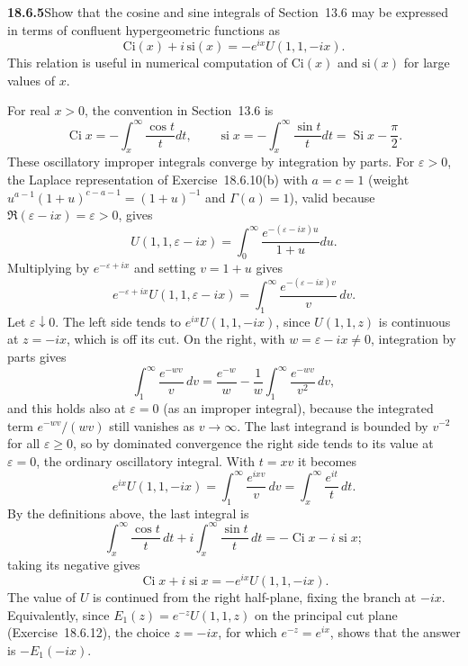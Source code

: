 \par\bigskip
\noindent\textbf{18.6.5}\quad Show that the cosine and sine
integrals of Section~13.6 may be expressed in terms of confluent
hypergeometric functions as
\[
\mathrm{Ci}(x)+i\,\mathrm{si}(x)=-e^{ix}U(1,1,-ix).
\]
This relation is useful in numerical computation of
$\mathrm{Ci}(x)$ and $\mathrm{si}(x)$ for large values of $x$.
\par\nobreak
\solution
For real $x>0$, the convention in Section~13.6 is
\[
\operatorname{Ci}x=-\int_x^\infty\frac{\cos t}{t}dt,
\qquad \operatorname{si}x=-\int_x^\infty\frac{\sin t}{t}dt
                         =\operatorname{Si}x-\frac\pi2.
\]
These oscillatory improper integrals converge by integration by
parts.  For $\varepsilon>0$, the Laplace representation of
Exercise~18.6.10(b) with $a=c=1$ (weight
$u^{a-1}(1+u)^{c-a-1}=(1+u)^{-1}$ and $\Gamma(a)=1$), valid because
$\Re(\varepsilon-ix)=\varepsilon>0$, gives
\[
U(1,1,\varepsilon-ix)
 =\int_0^\infty\frac{e^{-(\varepsilon-ix)u}}{1+u}du.
\]
Multiplying by $e^{-\varepsilon+ix}$ and setting $v=1+u$ gives
\[
e^{-\varepsilon+ix}U(1,1,\varepsilon-ix)
 =\int_1^\infty\frac{e^{-(\varepsilon-ix)v}}v\,dv.
\]
Let $\varepsilon\downarrow0$.  The left side tends to
$e^{ix}U(1,1,-ix)$, since $U(1,1,z)$ is continuous at $z=-ix$,
which is off its cut.  On the right, with $w=\varepsilon-ix\ne0$,
integration by parts gives
\[
\int_1^\infty\frac{e^{-wv}}v\,dv
=\frac{e^{-w}}w-\frac1w\int_1^\infty\frac{e^{-wv}}{v^2}\,dv,
\]
and this holds also at $\varepsilon=0$ (as an improper integral),
because the integrated term $e^{-wv}/(wv)$ still vanishes as
$v\to\infty$.  The last integrand is bounded by $v^{-2}$ for all
$\varepsilon\ge0$, so by dominated convergence the right side tends
to its value at $\varepsilon=0$, the ordinary oscillatory
integral.  With $t=xv$ it becomes
\[
e^{ix}U(1,1,-ix)=\int_1^\infty\frac{e^{ixv}}v\,dv
                        =\int_x^\infty\frac{e^{it}}t\,dt.
\]
By the definitions above, the last integral is
\[
\int_x^\infty\frac{\cos t}t\,dt+i\int_x^\infty\frac{\sin t}t\,dt
=-\operatorname{Ci}x-i\operatorname{si}x;
\]
taking its negative gives
\[
\boxed{\operatorname{Ci}x+i\operatorname{si}x
       =-e^{ix}U(1,1,-ix)}.
\]
The value of $U$ is continued from the right half-plane, fixing
the branch at $-ix$.  Equivalently, since $E_1(z)=e^{-z}U(1,1,z)$
on the principal cut plane (Exercise~18.6.12), the choice $z=-ix$,
for which $e^{-z}=e^{ix}$, shows that the answer is $-E_1(-ix)$.

